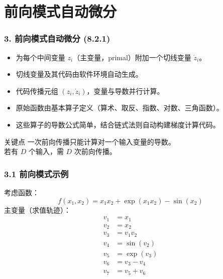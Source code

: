 \documentclass[t,aspectratio=169]{beamer} %
\begin{document}
\section{前向模式自动微分}

\begin{frame}
    \frametitle{3. 前向模式自动微分 (8.2.1)}
    \begin{itemize}
        \item 为每个中间变量 $z_i$（\alert{主变量}，primal）附加一个\alert{切线变量} $\dot{z}_i$。
        \item 切线变量及其代码由软件环境\alert{自动生成}。
        \item 代码传播\alert{元组} $(z_i, \dot{z}_i)$，变量与导数\alert{并行}计算。
        \item 原始函数由\alert{基本算子}定义（算术、取反、指数、对数、三角函数）。
        \item 这些算子的导数公式简单，结合\alert{链式法则}自动构建梯度计算代码。
    \end{itemize}
    \begin{block}{关键点}
        一次前向传播只能计算对\alert{一个}输入变量的导数。\\
        若有 $D$ 个输入，需 $D$ 次前向传播。
    \end{block}
\end{frame}

\begin{frame}
    \frametitle{3.1 前向模式示例}
    考虑函数：
    \begin{equation}
        f(x_1, x_2) = x_1 x_2 + \exp(x_1 x_2) - \sin(x_2)
        \tag{8.49}
    \end{equation}
    主变量（求值轨迹）：
    \begin{align}
        v_1 &= x_1 \tag{8.50} \\
        v_2 &= x_2 \tag{8.51} \\
        v_3 &= v_1 v_2 \tag{8.52} \\
        v_4 &= \sin(v_2) \tag{8.53} \\
        v_5 &= \exp(v_3) \tag{8.54} \\
        v_6 &= v_3 - v_4 \tag{8.55} \\
        v_7 &= v_5 + v_6 \tag{8.56}
    \end{align}
\end{frame}
\end{document}
